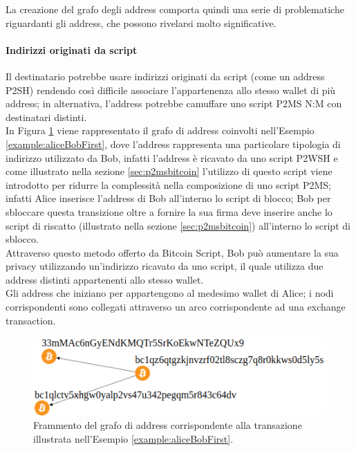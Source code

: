 La creazione del grafo degli address comporta quindi una serie di problematiche riguardanti gli address, che possono rivelarsi molto significative.

\paragraph*{Indirizzi originati da script}  Il destinatario potrebbe usare indirizzi originati da script (come un address P2SH) rendendo così difficile associare l’appartenenza allo stesso wallet di più address; in alternativa,  l’address potrebbe camuffare uno script P2MS N:M con destinatari distinti. \\
  In Figura \ref{fig:alicebobgraphaddress} viene rappresentato il grafo di address coinvolti nell’Esempio \ref{example:aliceBobFirst}, dove l’address  rappresenta una particolare tipologia di indirizzo utilizzato da Bob, infatti l'address è ricavato da uno script P2WSH e come illustrato
  nella sezione \ref{sec:p2msbitcoin} l'utilizzo di questo script viene introdotto per ridurre la complessità nella composizione di uno script P2MS; infatti Alice inserisce l’address di Bob all'interno lo script di blocco; Bob per sbloccare questa transizione oltre a fornire la sua firma deve inserire anche lo script di riscatto (illustrato nella sezione \ref{sec:p2msbitcoin}) all’interno lo script di sblocco. \\
  Attraverso questo metodo offerto da Bitcoin Script, Bob può aumentare la sua privacy utilizzando un'indirizzo ricavato da uno script, il quale utilizza due address distinti appartenenti allo stesso wallet.\\
  Gli address che iniziano per  appartengono al medesimo wallet di Alice; i nodi corrispondenti sono collegati attraverso un arco corrispondente ad una exchange transaction.

\begin{figure}
\centering
\includegraphics[scale=0.43]{images/exampleWithGraph/exchange-transaction-alice-bob.png}
  \caption{Frammento del grafo di address corrispondente alla transazione illustrata nell’Esempio \ref{example:aliceBobFirst}.\label{fig:alicebobgraphaddress}}
\end{figure}

